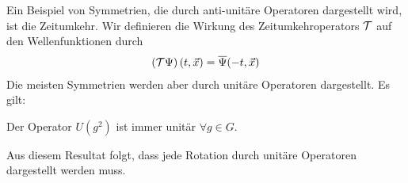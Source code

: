 Ein Beispiel von Symmetrien, die durch anti-unitäre Operatoren dargestellt wird,
ist die Zeitumkehr. Wir definieren die Wirkung des Zeitumkehroperators $\mathcal{T}$ auf
den Wellenfunktionen durch
\begin{align*}
    \left( \mathcal{T} \Psi \right) (t,\vec{x}) = \overline{\Psi} (-t,\vec{x})
\end{align*}
Die meisten Symmetrien werden aber durch unitäre Operatoren dargestellt.
Es gilt:
\begin{lemma}
    Der Operator $U(g^2)$ ist immer unitär $\forall g \in G$.
\end{lemma}
Aus diesem Resultat folgt, dass jede Rotation durch unitäre Operatoren dargestellt
werden muss.
